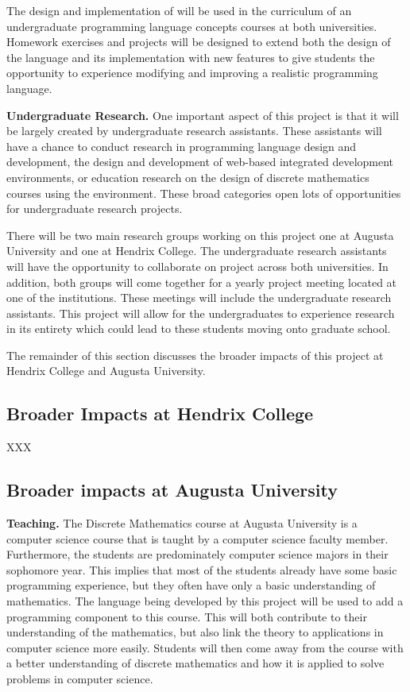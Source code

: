 The design and implementation of \thelang{} will be used in the
curriculum of an undergraduate programming language concepts courses
at both universities.  Homework exercises and projects will be
designed to extend both the design of the language and its
implementation with new features to give students the opportunity to
experience modifying and improving a realistic programming language.

\textbf{Undergraduate Research.} One important aspect of this project
is that it will be largely created by undergraduate research
assistants.  These assistants will have a chance to conduct research
in programming language design and development, the design and
development of web-based integrated development environments, or
education research on the design of discrete mathematics courses using
the \thelang{} environment.  These broad categories open lots of
opportunities for undergraduate research projects.

There will be two main research groups working on this project one at
Augusta University and one at Hendrix College.  The undergraduate
research assistants will have the opportunity to collaborate on
project across both universities.  In addition, both groups will come
together for a yearly project meeting located at one of the
institutions.  These meetings will include the undergraduate research
assistants.  This project will allow for the undergraduates to
experience research in its entirety which could lead to these students
moving onto graduate school.

The remainder of this section discusses the broader impacts of this
project at Hendrix College and Augusta University.

\subsection{Broader Impacts at Hendrix College}
\label{subsec:broader_impacts_at_hendrix_college}
XXX

\subsection{Broader impacts at Augusta University}
\label{subsec:broader_impacts_at_augusta_university}

\textbf{Teaching.}  The Discrete Mathematics course at Augusta
University is a computer science course that is taught by a computer
science faculty member.  Furthermore, the students are predominately
computer science majors in their sophomore year.  This implies that
most of the students already have some basic programming experience,
but they often have only a basic understanding of mathematics.  The
language being developed by this project will be used to add a
programming component to this course.  This will both contribute to
their understanding of the mathematics, but also link the theory to
applications in computer science more easily.  Students will then come
away from the course with a better understanding of discrete
mathematics and how it is applied to solve problems in computer
science.

